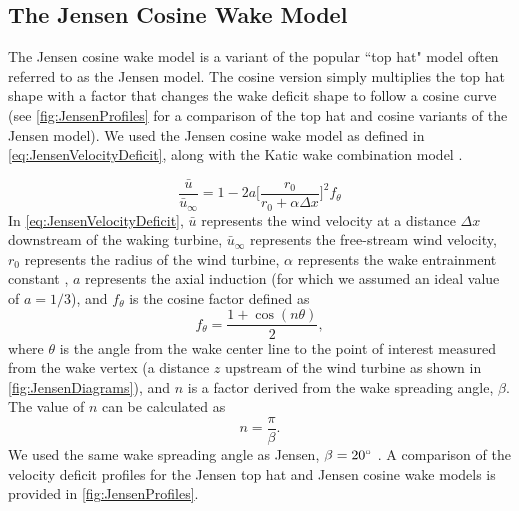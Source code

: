 \documentclass[journal abbreviation, manuscript]{copernicus}
\begin{document}
	\subsection{The Jensen Cosine Wake Model}
	The Jensen cosine wake model is a variant of the popular ``top hat" model often referred to as the Jensen model. The cosine version simply multiplies the top hat shape with a factor that changes the wake deficit shape to follow a cosine curve (see \ref{fig:JensenProfiles} for a comparison of the top hat and cosine variants of the Jensen model). We used the Jensen cosine wake model as defined in \ref{eq:JensenVelocityDeficit}, along with the Katic wake combination model \cite{katic1986}.
	
	\begin{equation}
		\frac{ \bar{u}}{\bar{u}_\infty} = 1 - 2a \bigg[\frac{r_0}{r_0 + \alpha \Delta x} \bigg]^2 f_\theta 
		\label{eq:JensenVelocityDeficit}
	\end{equation}
	In \ref{eq:JensenVelocityDeficit}, $\bar{u}$ represents the wind velocity at a distance $\Delta x$ downstream of the waking turbine, $\bar{u}_\infty$ represents the free-stream wind velocity, $r_0$ represents the radius of the wind turbine, $\alpha$ represents the wake entrainment constant \cite{jensen1983}, $a$ represents the axial induction (for which we assumed an ideal value of $a = 1/3$), and $f_\theta$ is the cosine factor defined as
	\begin{equation}
		f_\theta = \frac{1 + \cos{(n\theta)}}{2},
		\label{eq:JensenCosineAdjustment}
	\end{equation}
	where $\theta$ is the angle from the wake center line to the point of interest measured from the wake vertex (a distance $z$ upstream of the wind turbine as shown in \ref{fig:JensenDiagrams}), and $n$ is a factor derived from the wake spreading angle, $\beta$. The value of $n$ can be calculated as
	\begin{equation}
		n = \frac{\pi}{\beta}.
		\label{eq:nFactor}
	\end{equation}
	We used the same wake spreading angle as Jensen, $\beta = 20 ^{\circ}$  \cite{jensen1983}. A comparison of the velocity deficit profiles for the Jensen top hat and Jensen cosine wake models is provided in \ref{fig:JensenProfiles}.
\end{document}
